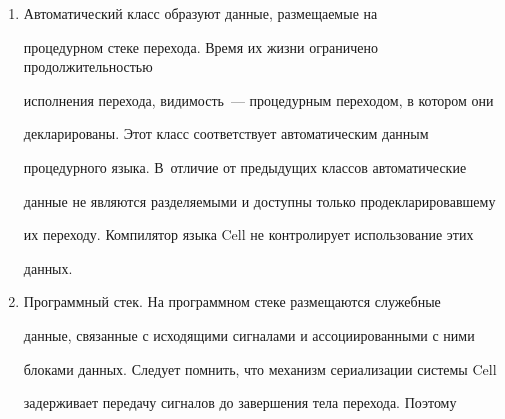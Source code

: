\begin{enumerate}[1.]
переходам порожденных ячеек, если путь порождения не содержит других 


ячеек с локальными декларациями. Переходы любой порожденной ячейки 


имеют доступ по короткому имени к единственному набору локальных данных 


родительской ячейки в пределах одного экземпляра иерархии. Локальные 


данные декларируются и именуются по правилам процедурного языка в 


декларативных директивах языка Cell с именем local. При использовании этих 


данных в командах перехода к их имени добавляется префикс~``@''. 


Компилятор языка Cell выполняет преобразование таких имен для доступа к 


требуемой области памяти. В~пределах одного экземпляра иерархии функции 


перехода могут обращаться к локальным данным не только родительской 


ячейки. В~этом случае используется полное имя переменной, включающее 


иерархическое имя декларирующей ячейки.


     \item Автоматический класс образуют данные, размещаемые на 


процедурном стеке перехода. Время их жизни ограничено продолжительностью 


исполнения перехода, видимость~--- процедурным переходом, в котором они 


декларированы. Этот класс соответствует автоматическим данным 


процедурного языка. В~отличие от предыдущих классов автоматические 


данные не являются разделяемыми и доступны только продекларировавшему 


их переходу. Компилятор языка Cell не контролирует использование этих 


данных.


     \item Программный стек. На программном стеке размещаются служебные 


данные, связанные с исходящими сигналами и ассоциированными с ними 


блоками данных. Следует помнить, что механизм сериализации системы Cell 


задерживает передачу сигналов до завершения тела перехода. Поэтому 



\end{enumerate}
